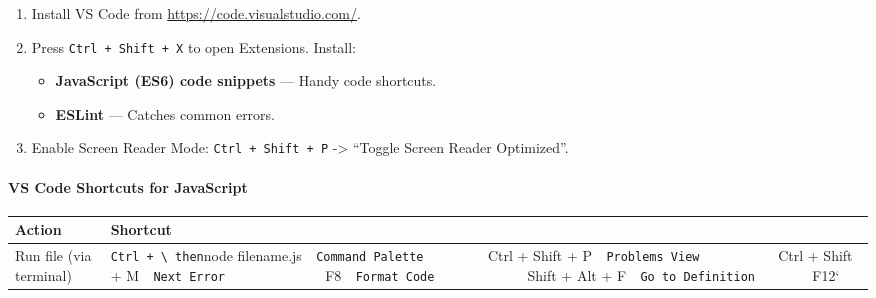 \documentclass[
  justified,
  openright,
]{tufte-book}
\let\subsection\paragraph
\let\paragraph\paragraph
\let\subsection\paragraph
\let\paragraph\paragraph
\providecommand{\tightlist}{%
  \setlength{\itemsep}{0pt}\setlength{\parskip}{0pt}}
\begin{document}
\begin{enumerate}
\def\labelenumi{\arabic{enumi}.}
\tightlist
\item
  Install VS Code from \url{https://code.visualstudio.com/}.
\item
  Press \texttt{Ctrl\ +\ Shift\ +\ X} to open Extensions. Install:

  \begin{itemize}
  \tightlist
  \item
    \textbf{JavaScript (ES6) code snippets} --- Handy code shortcuts.
  \item
    \textbf{ESLint} --- Catches common errors.
  \end{itemize}
\item
  Enable Screen Reader Mode: \texttt{Ctrl\ +\ Shift\ +\ P}
  -\textgreater{} ``Toggle Screen Reader Optimized''.
\end{enumerate}

\subsection{VS Code Shortcuts for
JavaScript}\label{vs-code-shortcuts-for-javascript}

\begin{fullwidth}{\def\LTcaptype{none} %
\begin{longtable}[]{@{}
  >{\raggedright\arraybackslash}p{}
  >{\raggedright\arraybackslash}p{}@{}}
\toprule\noalign{}
\begin{minipage}[b]{\linewidth}\raggedright
Action
\end{minipage} & \begin{minipage}[b]{\linewidth}\raggedright
Shortcut
\end{minipage} \\
\midrule\noalign{}
\endhead
\bottomrule\noalign{}
\endlastfoot
Run file (via terminal) &
\texttt{Ctrl\ +\ \textbackslash{}\textasciigrave{}\textasciigrave{}\ then}node
filename.js\texttt{\textbar{}\ \textbar{}\ Command\ Palette\ \ \ \ \ \ \ \ \ \textbar{}}Ctrl
+ Shift +
P\texttt{\textbar{}\ \textbar{}\ Problems\ View\ \ \ \ \ \ \ \ \ \ \ \textbar{}}Ctrl
+ Shift +
M\texttt{\textbar{}\ \textbar{}\ Next\ Error\ \ \ \ \ \ \ \ \ \ \ \ \ \ \textbar{}}F8\texttt{\textbar{}\ \textbar{}\ Format\ Code\ \ \ \ \ \ \ \ \ \ \ \ \ \textbar{}}Shift
+ Alt +
F\texttt{\textbar{}\ \textbar{}\ Go\ to\ Definition\ \ \ \ \ \ \ \ \textbar{}}F12` \\
\end{longtable}
}
\end{fullwidth}
\end{document}

